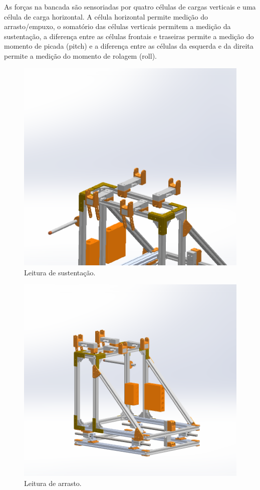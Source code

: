 As forças na bancada são sensoriadas por quatro células de cargas verticais e uma célula de carga horizontal. A célula horizontal permite medição do arrasto/empuxo, o somatório das células verticais permitem a medição da sustentação, a diferença entre as células frontais e traseiras permite a medição do momento de picada (pitch) e a diferença entre as células da esquerda e da direita permite a medição do momento de rolagem (roll).

\begin{figure}[!ht]
    \centering
    \includegraphics[width=.8\linewidth]{figuras/renders/esquematico_celulas_lift.png}
    \caption{Leitura de sustentação\cite{autor}.}
    \label{fig:leitura_sustentacao}
\end{figure}

\begin{figure}[!ht]
    \centering
    \includegraphics[width=.8\linewidth]{figuras/renders/esquematico_celulas_drag_2.png}
    \caption{Leitura de arrasto\cite{autor}.}
    \label{fig:leitura_arrasto}
\end{figure}

